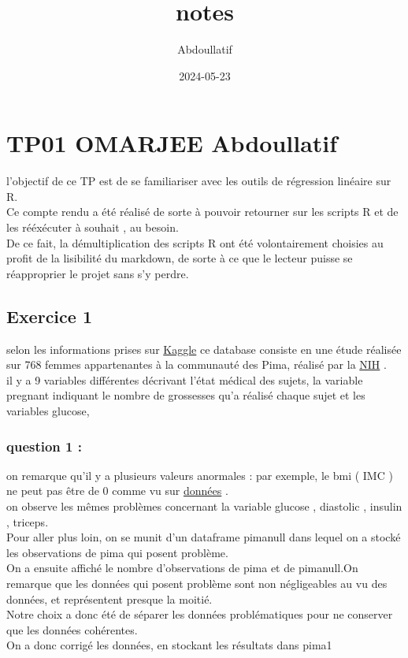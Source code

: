 \documentclass[
]{article}
\title{notes}
\author{Abdoullatif}
\date{2024-05-23}
\begin{document}
\maketitle

\section{TP01 OMARJEE Abdoullatif}\label{tp01-omarjee-abdoullatif}

l'objectif de ce TP est de se familiariser avec les outils de régression
linéaire sur R.\\
Ce compte rendu a été réalisé de sorte à pouvoir retourner sur les
scripts R et de les rééxécuter à souhait , au besoin.\\
De ce fait, la démultiplication des scripts R ont été volontairement
choisies au profit de la lisibilité du markdown, de sorte à ce que le
lecteur puisse se réapproprier le projet sans s'y perdre.\\

\subsection{Exercice 1}\label{exercice-1}

selon les informations prises sur
\href{https://www.kaggle.com/datasets/uciml/pima-indians-diabetes-database}{Kaggle}
ce database consiste en une étude réalisée sur 768 femmes appartenantes
à la communauté des Pima, réalisé par la
\href{https://www.niddk.nih.gov/}{NIH} .\\
il y a 9 variables différentes décrivant l'état médical des sujets, la
variable {pregnant} indiquant le nombre de grossesses qu'a réalisé
chaque sujet et les variables {glucose},

\subsubsection{question 1 :}\label{question-1}

on remarque qu'il y a plusieurs valeurs anormales : par exemple, le
{bmi} ( IMC ) ne peut pas être de 0 comme vu sur
\href{données.R}{données} .\\
on observe les mêmes problèmes concernant la variable {glucose} ,
{diastolic} , {insulin} , {triceps}.\\
Pour aller plus loin, on se munit d'un dataframe {pimanull} dans lequel
on a stocké les observations de {pima} qui posent problème.\\
On a ensuite affiché le nombre d'observations de {pima} et de
{pimanull}.On remarque que les données qui posent problème sont non
négligeables au vu des données, et représentent presque la moitié.\\
Notre choix a donc été de séparer les données problématiques pour ne
conserver que les données cohérentes.\\
On a donc corrigé les données, en stockant les résultats dans {pima1}\\
\end{document}
